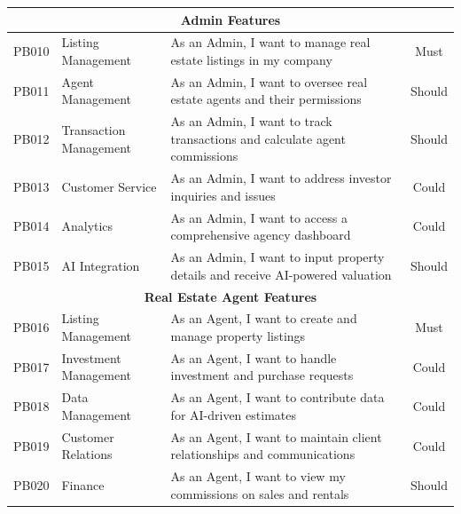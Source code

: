 \begin{longtable}{|c|l|p{8cm}|c|}
    \multicolumn{4}{|c|}{\cellcolor{primary!15}\textbf{\textcolor{primary}{Admin Features}}} \\
    \hline
    PB010 & Listing Management & As an Admin, I want to manage real estate listings in my company & Must \\
    \hline
    PB011 & Agent Management & As an Admin, I want to oversee real estate agents and their permissions & Should \\
    \hline
    PB012 & Transaction Management & As an Admin, I want to track transactions and calculate agent commissions & Should \\
    \hline
    PB013 & Customer Service & As an Admin, I want to address investor inquiries and issues & Could \\
    \hline
    PB014 & Analytics & As an Admin, I want to access a comprehensive agency dashboard & Could \\
    \hline
    PB015 & AI Integration & As an Admin, I want to input property details and receive AI-powered valuation & Should \\
    \hline
    
    \multicolumn{4}{|c|}{\cellcolor{primary!15}\textbf{\textcolor{primary}{Real Estate Agent Features}}} \\
    \hline
    PB016 & Listing Management & As an Agent, I want to create and manage property listings & Must \\
    \hline
    PB017 & Investment Management & As an Agent, I want to handle investment and purchase requests & Could \\
    \hline
    PB018 & Data Management & As an Agent, I want to contribute data for AI-driven estimates & Could \\
    \hline
    PB019 & Customer Relations & As an Agent, I want to maintain client relationships and communications & Could \\
    \hline
    PB020 & Finance & As an Agent, I want to view my commissions on sales and rentals & Should \\
    \hline
    

\end{longtable}
